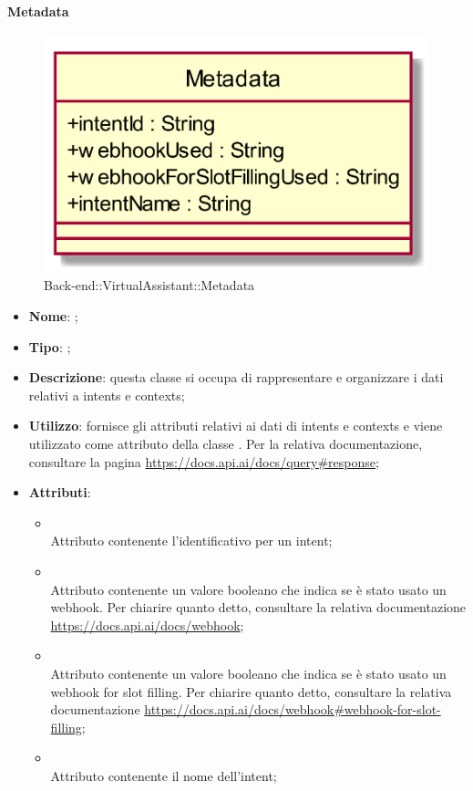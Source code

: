 \hypertarget{Metadata_label}{\paragraph{Metadata}}
\begin{figure}[h]
	\centering
	\includegraphics[width=\textwidth,height=\textheight,keepaspectratio]{images/ClassMetadata.png}
	\caption{Back-end::VirtualAssistant::Metadata}
\end{figure}
\begin{itemize}
	\item \textbf{Nome}: ;
	\item \textbf{Tipo}: ;
	\item \textbf{Descrizione}: questa classe si occupa di rappresentare e organizzare i dati relativi a intents e contexts;
	\item \textbf{Utilizzo}: fornisce gli attributi relativi ai dati di intents e contexts e viene utilizzato come attributo della classe .
Per la relativa documentazione, consultare la pagina \url{https://docs.api.ai/docs/query#response};
	\item \textbf{Attributi}:
	\begin{itemize}
		\item[]  \\
		Attributo contenente l'identificativo per un intent;
		\item[]  \\
		Attributo contenente un valore booleano che indica se è stato usato un webhook. Per chiarire quanto detto, consultare la relativa documentazione \url{https://docs.api.ai/docs/webhook};
		\item[]  \\
		Attributo contenente un valore booleano che indica se è stato usato un webhook for slot filling.
Per chiarire quanto detto, consultare la relativa documentazione \url{https://docs.api.ai/docs/webhook#webhook-for-slot-filling};
		\item[]  \\
		Attributo contenente il nome dell'intent;
	\end{itemize}
\end{itemize}

